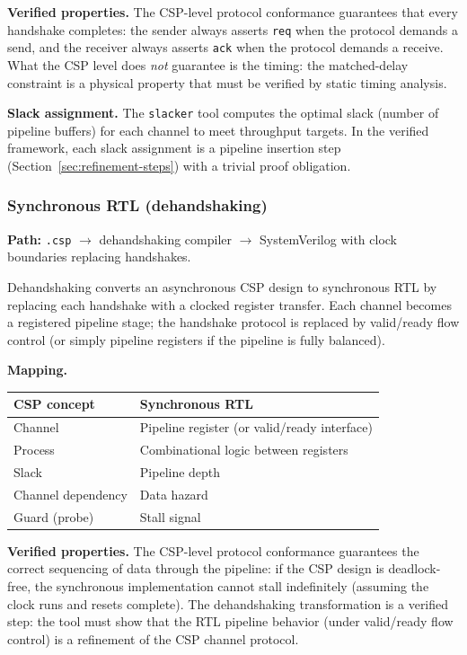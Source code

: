 \documentclass[11pt]{article}
\begin{document}
\textbf{Verified properties.}
The CSP-level protocol conformance guarantees that every handshake
completes: the sender always asserts \texttt{req} when the protocol
demands a send, and the receiver always asserts \texttt{ack} when the
protocol demands a receive.  What the CSP level does \emph{not}
guarantee is the timing: the matched-delay constraint is a physical
property that must be verified by static timing analysis.

\textbf{Slack assignment.}
The \texttt{slacker} tool computes the optimal slack (number of
pipeline buffers) for each channel to meet throughput targets.  In the
verified framework, each slack assignment is a pipeline insertion step
(Section~\ref{sec:refinement-steps}) with a trivial proof obligation.

\subsubsection{Synchronous RTL (dehandshaking)}
\label{sec:rtl}

\textbf{Path:} \texttt{.csp} $\to$ dehandshaking compiler $\to$
SystemVerilog with clock boundaries replacing handshakes.

Dehandshaking converts an asynchronous CSP design to synchronous RTL
by replacing each handshake with a clocked register transfer.  Each
channel becomes a registered pipeline stage; the handshake protocol
is replaced by valid/ready flow control (or simply pipeline registers
if the pipeline is fully balanced).

\textbf{Mapping.}
\begin{center}
\begin{tabular}{ll}
\toprule
\textbf{CSP concept} & \textbf{Synchronous RTL} \\
\midrule
Channel & Pipeline register (or valid/ready interface) \\
Process & Combinational logic between registers \\
Slack & Pipeline depth \\
Channel dependency & Data hazard \\
Guard (probe) & Stall signal \\
\bottomrule
\end{tabular}
\end{center}

\textbf{Verified properties.}
The CSP-level protocol conformance guarantees the correct sequencing
of data through the pipeline: if the CSP design is deadlock-free, the
synchronous implementation cannot stall indefinitely (assuming the
clock runs and resets complete).  The dehandshaking transformation is
a verified step: the tool must show that the RTL pipeline behavior
(under valid/ready flow control) is a refinement of the CSP channel
protocol.
\end{document}

